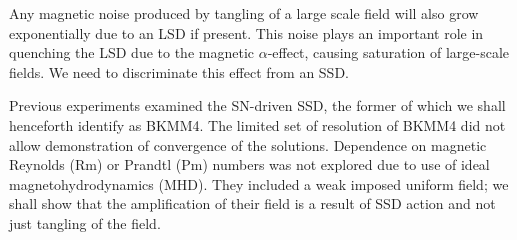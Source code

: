 \documentclass[preprint2]{aastex63}
\newcommand\BKM{{\sf BKMM4}}
\newcommand{\fg}[1]{\textcolor{midgreen}{#1}}
\begin{document}
 Any magnetic noise produced by tangling \fg{of a large scale field}
 will also grow exponentially due to an LSD if present.
 This noise plays an important role in quenching the LSD due to the magnetic
 $\alpha$-effect, causing saturation of large-scale fields.
 We need to discriminate this effect from an SSD.   

 Previous experiments \citep[e.g.,][]{BKMM04,BalKim05,MacLow:2005}
 examined the SN-driven SSD\fg{, the former of which we shall henceforth
 identify as \BKM}.
 \fg{The limited set of resolution \fg{of \BKM } did not allow
 demonstration of convergence of the solutions.
 Dependence on magnetic Reynolds (Rm) or Prandtl (Pm) numbers was not
 explored due to use of ideal magnetohydrodynamics (MHD).}
 They included a weak imposed uniform field; we shall show
 that the amplification of their field is a result
 of SSD action and not just tangling of the field.
\end{document}
